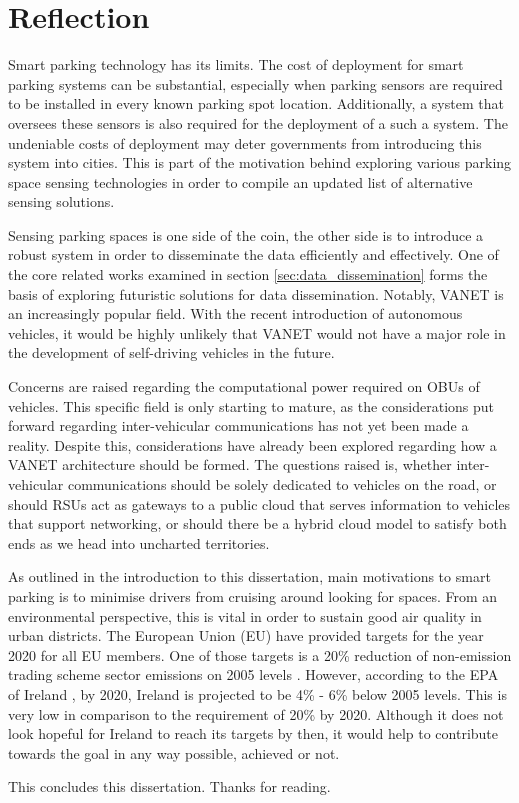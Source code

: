 \section{Reflection}
Smart parking technology has its limits. The cost of deployment for smart parking systems can be substantial, especially when parking sensors are required to be installed in every known parking spot location. Additionally, a system that oversees these sensors is also required for the deployment of a such a system. The undeniable costs of deployment may deter governments from introducing this system into cities. This is part of the motivation behind exploring various parking space sensing technologies in order to compile an updated list of alternative sensing solutions.

Sensing parking spaces is one side of the coin, the other side is to introduce a robust system in order to disseminate the data efficiently and effectively. One of the core related works examined in section \ref{sec:data_dissemination} forms the basis of exploring futuristic solutions for data dissemination. Notably, \ac{VANET} is an increasingly popular field. With the recent introduction of autonomous vehicles, it would be highly unlikely that \ac{VANET} would not have a major role in the development of self-driving vehicles in the future.

Concerns are raised regarding the computational power required on \ac{OBU}s of vehicles. This specific field is only starting to mature, as the considerations put forward regarding inter-vehicular communications has not yet been made a reality. Despite this, considerations have already been explored regarding how a \ac{VANET} architecture should be formed. The questions raised is, whether inter-vehicular communications should be solely dedicated to vehicles on the road, or should \ac{RSU}s act as gateways to a public cloud that serves information to vehicles that support networking, or should there be a hybrid cloud model to satisfy both ends as we head into uncharted territories.

As outlined in the introduction to this dissertation, main motivations to smart parking is to minimise drivers from cruising around looking for spaces. From an environmental perspective, this is vital in order to sustain good air quality in urban districts. The European Union (EU) have provided targets for the year 2020 for all EU members. One of those targets is a 20\% reduction of non-emission trading scheme sector emissions on 2005 levels \citep{Pereira2005OverviewTargets}. However, according to the \ac{EPA} of Ireland \citep{Gas2017EPAProjections}, by 2020, Ireland is projected to be 4\% - 6\% below 2005 levels. This is very low in comparison to the requirement of 20\% by 2020. Although it does not look hopeful for Ireland to reach its targets by then, it would help to contribute towards the goal in any way possible, achieved or not.

This concludes this dissertation. Thanks for reading.